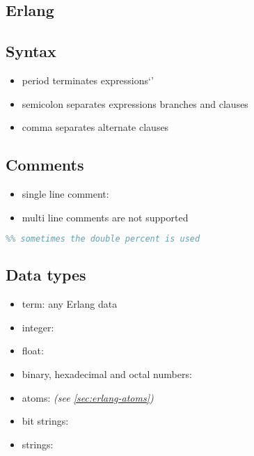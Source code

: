 \documentclass[a4paper,landscape,10pt]{article}
\begin{document}
\begin{multicols*}{2}

  \section{Erlang}

  \subsection{Syntax}

  \begin{itemize}
    \item period  terminates expressions`'
    \item semicolon \ierlang{;} separates expressions branches and clauses
    \item comma \ierlang{,} separates alternate clauses
  \end{itemize}

  \subsection{Comments}

  \begin{itemize}
    \item single line comment: \ierlang{\%}
    \item multi line comments are not supported
  \end{itemize}

  \begin{lstlisting}[language=Erlang]
% single line comment
%% sometimes the double percent is used
\end{lstlisting}

  \subsection{Data types}

  \begin{itemize}
    \item term: any Erlang data
    \item integer: 
    \item float: 
    \item binary, hexadecimal and octal numbers: 
    \item atoms:  \textit{(see \ref{sec:erlang-atoms})}
    \item bit strings: 
    \item strings: 
  \end{itemize}


\end{multicols*}
\end{document}
